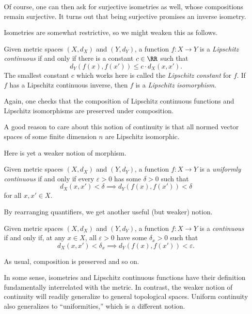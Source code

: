\documentclass[../notes.tex]{subfiles}
\begin{document}
\begin{remark}
	Of course, one can then ask for surjective isometries as well, whose compositions remain surjective. It turns out that being surjective promises an inverse isometry.
\end{remark}
Isometries are somewhat restrictive, so we might weaken this as follows.
\begin{definition}
	Given metric spaces $(X,d_X)$ and $(Y,d_Y)$, a function $f\colon X\to Y$ is a \textit{Lipschitz continuous} if and only if there is a constant $c\in\RR$ such that
	\[d_Y(f(x),f(x'))\le c\cdot d_X(x,x').\]
	The smallest constant $c$ which works here is called the \textit{Lipschitz constant} for $f$. If $f$ has a Lipschitz continuous inverse, then $f$ is a \textit{Lipschitz isomorphism}.
\end{definition}
Again, one checks that the composition of Lipschitz continuous functions and Lipschitz isomorphisms are preserved under composition.
\begin{remark}
	A good reason to care about this notion of continuity is that all normed vector spaces of some finite dimension $n$ are Lipschitz isomorphic.
\end{remark}
Here is yet a weaker notion of morphism.
\begin{definition}
	Given metric spaces $(X,d_X)$ and $(Y,d_Y)$, a function $f\colon X\to Y$ is a \textit{uniformly continuous} if and only if every $\varepsilon>0$ has some $\delta>0$ such that
	\[d_X(x,x')<\delta\implies d_Y(f(x),f(x'))<\delta\]
	for all $x,x'\in X$.
\end{definition}
By rearranging quantifiers, we get another useful (but weaker) notion.
\begin{definition}[Continuous]
	Given metric spaces $(X,d_X)$ and $(Y,d_Y)$, a function $f\colon X\to Y$ is a \textit{continuous} if and only if, at any $x\in X$, all $\varepsilon>0$ have some $\delta_x>0$ such that
	\[d_X(x,x')<\delta_x\implies d_Y(f(x),f(x'))<\varepsilon.\]
\end{definition}
As usual, composition is preserved and so on.
\begin{remark}
	In some sense, isometries and Lipschitz continuous functions have their definition fundamentally interrelated with the metric. In contrast, the weaker notion of continuity will readily generalize to general topological spaces. Uniform continuity also generalizes to ``uniformities,'' which is a different notion.
\end{remark}
\end{document}
